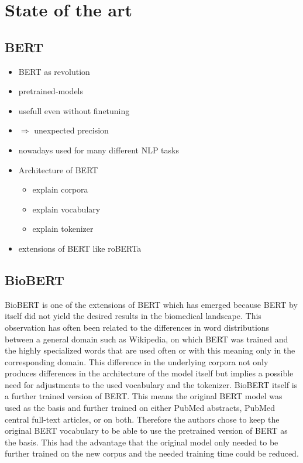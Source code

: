 \chapter{State of the art}
\section{BERT}
\color{ForestGreen}
\begin{itemize}
	\item BERT as revolution
	\item pretrained-models
	\item usefull even without finetuning
	\item $\Rightarrow$ unexpected precision
	\item nowadays used for many different NLP tasks
	\item Architecture of BERT
	\begin{itemize}
		\item explain corpora
		\item explain vocabulary
		\item explain tokenizer
	\end{itemize}
	\item extensions of BERT like roBERTa
\end{itemize}
\color{black}
\section{BioBERT}
BioBERT is one of the extensions of BERT which has emerged because BERT by itself did not yield the desired results in the biomedical landscape. This observation has often been related to the differences in word distributions between a general domain such as Wikipedia, on which BERT was trained and the highly specialized words that are used often or with this meaning only in the corresponding domain. This difference in the underlying corpora not only produces differences in the architecture of the model itself but implies a possible need for adjustments to the used vocabulary and the tokenizer. \cite{Lee2019} 
\newline
BioBERT itself is a further trained version of BERT. This means the original BERT model was used as the basis and further trained on either PubMed abstracts, PubMed central full-text articles, or on both. Therefore the authors chose to keep the original BERT vocabulary to be able to use the pretrained version of BERT as the basis. This had the advantage that the original model only needed to be further trained on the new corpus and the needed training time could be reduced.

